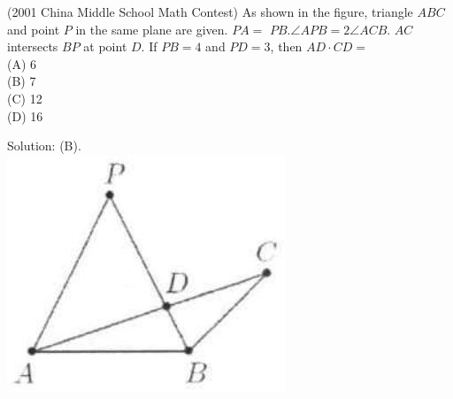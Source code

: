 \documentclass{article}
\begin{document}
(2001 China Middle School Math Contest) As shown in the figure, triangle \(A B C\) and point \(P\) in the same plane are given. \(P A=\) \(P B . \angle A P B=2 \angle A C B\). \(A C\) intersects \(B P\) at point \(D\). If \(P B=4\) and \(P D=3\), then \(A D \cdot C D=\)\\
(A) 6\\
(B) 7\\
(C) 12\\
(D) 16

Solution: (B).\\
\centering
\includegraphics[width=\textwidth]{images/203.jpg}
\end{document}
